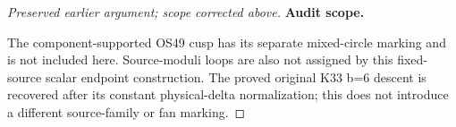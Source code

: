 \begin{proof}[Preserved earlier argument; scope corrected above]
\par\medskip\noindent\textbf{Audit scope.}\enspace

The component-supported OS49 cusp has its separate mixed-circle
marking and is not included here. Source-moduli loops are also
not assigned by this fixed-source scalar endpoint construction.
The proved original K33 b=6 descent is recovered after its
constant physical-delta normalization; this does not introduce
a different source-family or fan marking.
\end{proof}
